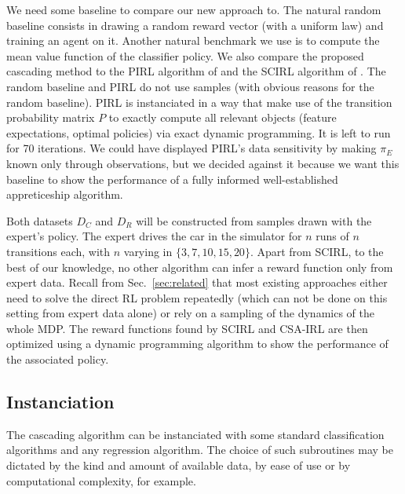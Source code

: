 \documentclass[smallextended]{svjour3}
\begin{document}
We need some baseline to compare our new approach to. The natural random baseline consists in drawing a random reward vector (with a uniform law) and training an agent on it. Another natural benchmark we use is to compute the mean value function of the classifier policy. We also compare the proposed cascading method to the PIRL algorithm of \cite{abbeel2004apprenticeship} and the SCIRL algorithm of \cite{klein2012scirl}. The random baseline and PIRL do not use samples (with obvious reasons for the random baseline). PIRL is instanciated in a way that make use of the transition probability matrix $P$ to exactly compute all relevant objects (feature expectations, optimal policies) via exact dynamic programming. It is left to run for 70 iterations. We could have displayed PIRL's data sensitivity by making $\pi_E$ known only through observations, but we decided against it because we want this baseline to show the performance of a fully informed well-established appreticeship algorithm.

Both datasets $D_C$ and $D_R$ will be constructed from samples drawn with the expert's policy. The expert drives the car in the simulator for $n$ runs of $n$ transitions each, with $n$ varying in $\{3,7,10,15,20\}$. Apart from SCIRL, to the best of our knowledge, no other algorithm can infer a reward function only from expert data. Recall from Sec.~\ref{sec:related} that most existing approaches either need to solve the direct RL problem repeatedly (which can not be done on this setting from expert data alone) or rely on a sampling of the dynamics of the whole MDP. The reward functions found by SCIRL and CSA-IRL are then optimized using a dynamic programming algorithm to show the performance of the associated policy.

\subsection{Instanciation}
\label{subsec:instanciation}
The cascading algorithm can be instanciated with some standard classification algorithms and any regression algorithm. The choice of such subroutines may be dictated by the kind and amount of available data, by ease of use or by computational complexity, for example.
\end{document}
